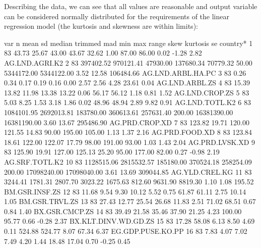 \documentclass[a4paper]{article}
\begin{document}
Describing the data, we can see that all values are reasonable and output
variable can be considered normally distributed for the requirements of the
linear regression model (the kurtosis and skewness are within limits):
\begingroup
    \fontsize{8pt}{9pt}\selectfont
\begin{Schunk}
\begin{Soutput}
                     var  n       mean         sd    median   trimmed       mad    min         max       range  skew kurtosis        se
country*               1 83      43.73      25.67     43.00     43.67     32.62   1.00       87.00       86.00  0.02    -1.28      2.82
AG.LND.AGRI.K2         2 83  397402.52  970121.41  47930.00 137680.34  70779.32  50.00  5344172.00  5344122.00  3.52    12.58 106484.66
AG.LND.ARBL.HA.PC      3 83       0.26       0.34      0.17      0.19      0.16   0.00        2.57        2.56  4.28    23.61      0.04
AG.LND.ARBL.ZS         4 83      15.39      13.82     11.98     13.38     13.22   0.06       56.17       56.12  1.18     0.81      1.52
AG.LND.CROP.ZS         5 83       5.03       8.25      1.53      3.18      1.86   0.02       48.96       48.94  2.89     9.82      0.91
AG.LND.TOTL.K2         6 83 1084101.95 2692013.81 183780.00 360613.61 257631.40 200.00 16381390.00 16381190.00  3.60    13.67 295486.90
AG.PRD.CROP.XD         7 83     123.82      19.71    120.00    121.55     14.83  90.00      195.00      105.00  1.13     1.37      2.16
AG.PRD.FOOD.XD         8 83     123.84      18.61    122.00    122.07     17.79  98.00      191.00       93.00  1.03     1.43      2.04
AG.PRD.LVSK.XD         9 83     125.90      19.91    127.00    125.13     25.20  95.00      177.00       82.00  0.27    -0.98      2.19
AG.SRF.TOTL.K2        10 83 1128515.06 2815532.57 185180.00 370524.18 258254.09 200.00 17098240.00 17098040.00  3.61    13.69 309044.85
AG.YLD.CREL.KG        11 83    3244.41    1781.31   2807.70   3023.22   1675.63 812.60     9631.90     8819.30  1.10     1.08    195.52
BM.GSR.INSF.ZS        12 83      11.68       9.54      9.30     10.12      5.52   0.75       61.87       61.11  2.75    10.14      1.05
BM.GSR.TRVL.ZS        13 83      27.43      12.77     25.54     26.68     11.83   2.51       71.02       68.51  0.67     0.84      1.40
BX.GSR.CMCP.ZS        14 83      39.49      21.58     35.46     37.90     21.25   4.23      100.00       95.77  0.66    -0.28      2.37
BX.KLT.DINV.WD.GD.ZS  15 83      17.28      58.08      6.13      8.50      4.69   0.11      524.88      524.77  8.07    67.34      6.37
EG.GDP.PUSE.KO.PP     16 83       7.83       4.07      7.02      7.49      4.20   1.44       18.48       17.04  0.70    -0.25      0.45

\end{Soutput}
\end{Schunk}
\end{document}
